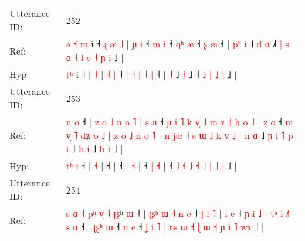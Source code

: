 \documentclass[10pt]{article}
\DeclareRobustCommand{\hl}[1]{{\textcolor{red}{#1}}}
\begin{document}
\begin{longtable}{ll}
 \\
\midrule
Utterance ID: & 252 \\
Ref: & \hl{ə}\hl{ }\hl{˧}\hl{ }\hl{m} i ˧\hl{ }\hl{ɻ} \hl{æ} \hl{˩} | \hl{ɲ} \hl{i} ˧\hl{ }\hl{m} \hl{i} ˧\hl{ }\hl{q}\hl{ʰ} \hl{æ} ˧\hl{ }\hl{ʂ} \hl{æ} ˧ |\hl{ }\hl{p}\hl{ʰ} \hl{i} ˩\hl{ }\hl{d} \hl{ɑ} ˩\hl{˥}\hl{ }\hl{|}\hl{ }\hl{s}\hl{ }\hl{ɑ} ˧\hl{ }\hl{l} \hl{e} \hl{˧} \hl{ɲ} \hl{i} ˩ |
 \\
Hyp: & \hl{}\hl{}\hl{}\hl{t}\hl{ʰ} i ˧\hl{}\hl{} \hl{|} \hl{˧} | \hl{˧} \hl{|} ˧\hl{}\hl{} \hl{|} ˧\hl{}\hl{}\hl{} \hl{|} ˧\hl{}\hl{} \hl{|} ˧ |\hl{}\hl{}\hl{} \hl{˧} ˩\hl{}\hl{} \hl{˧} ˩\hl{}\hl{}\hl{}\hl{}\hl{}\hl{}\hl{} ˧\hl{}\hl{} \hl{˩} \hl{|} \hl{˩} \hl{|} ˩ |
 \\
\midrule
Utterance ID: & 253 \\
Ref: & \hl{}\hl{n} \hl{o} ˧ |\hl{ }\hl{z}\hl{ }\hl{o}\hl{ }\hl{˩}\hl{ }\hl{n}\hl{ }\hl{o} \hl{˥} |\hl{ }\hl{s}\hl{ }\hl{ɑ} ˧\hl{ }\hl{ɲ}\hl{ }\hl{i}\hl{ }\hl{˥}\hl{ }\hl{k}\hl{ }\hl{v}\hl{̩}\hl{ }\hl{˩}\hl{ }\hl{m}\hl{ }\hl{ɤ}\hl{ }\hl{˩}\hl{ }\hl{h}\hl{ }\hl{o}\hl{ }\hl{˩} |\hl{ }\hl{z}\hl{ }\hl{o} ˧\hl{ }\hl{m}\hl{ }\hl{v}\hl{̩}\hl{ }\hl{˥}\hl{ }\hl{d}\hl{ʑ}\hl{ }\hl{o}\hl{ }\hl{˩} |\hl{ }\hl{z}\hl{ }\hl{o}\hl{ }\hl{˩}\hl{ }\hl{n}\hl{ }\hl{o} \hl{˥} |\hl{ }\hl{n}\hl{ }\hl{j}\hl{æ} ˧\hl{ }\hl{s}\hl{ }\hl{ɯ}\hl{ }\hl{˩}\hl{ }\hl{k} \hl{v}\hl{̩} \hl{˩} |\hl{ }\hl{n} \hl{ɑ} ˩\hl{ }\hl{ɲ}\hl{ }\hl{i} \hl{˥} \hl{p} \hl{i} ˩\hl{ }\hl{b} \hl{i} ˩\hl{ }\hl{b} \hl{i} ˩ |
 \\
Hyp: & \hl{t}\hl{ʰ} \hl{i} ˧ |\hl{}\hl{}\hl{}\hl{}\hl{}\hl{}\hl{}\hl{}\hl{}\hl{} \hl{˧} |\hl{}\hl{}\hl{}\hl{} ˧\hl{}\hl{}\hl{}\hl{}\hl{}\hl{}\hl{}\hl{}\hl{}\hl{}\hl{}\hl{}\hl{}\hl{}\hl{}\hl{}\hl{}\hl{}\hl{}\hl{}\hl{}\hl{}\hl{}\hl{}\hl{} |\hl{}\hl{}\hl{}\hl{} ˧\hl{}\hl{}\hl{}\hl{}\hl{}\hl{}\hl{}\hl{}\hl{}\hl{}\hl{}\hl{}\hl{}\hl{} |\hl{}\hl{}\hl{}\hl{}\hl{}\hl{}\hl{}\hl{}\hl{}\hl{} \hl{˧} |\hl{}\hl{}\hl{}\hl{}\hl{} ˧\hl{}\hl{}\hl{}\hl{}\hl{}\hl{}\hl{}\hl{} \hl{}\hl{|} \hl{˧} |\hl{}\hl{} \hl{˧} ˩\hl{}\hl{}\hl{}\hl{} \hl{˧} \hl{˩} \hl{˧} ˩\hl{}\hl{} \hl{|} ˩\hl{}\hl{} \hl{|} ˩ |
 \\
\midrule
Utterance ID: & 254 \\
Ref: & \hl{s}\hl{ }\hl{ɑ}\hl{ }\hl{˧}\hl{ }\hl{p}\hl{ʰ}\hl{ }\hl{v}\hl{̩}\hl{ }\hl{˧}\hl{ }\hl{ʈ}\hl{ʂ}ʰ \hl{ɯ} ˧ |\hl{ }\hl{ʈ}\hl{ʂ}\hl{ʰ}\hl{ }\hl{ɯ}\hl{ }\hl{˧}\hl{ }\hl{n}\hl{ }\hl{e} ˧\hl{ }\hl{ʝ}\hl{ }\hl{i}\hl{ }\hl{˥} |\hl{ }\hl{l}\hl{ }\hl{e} ˧\hl{ }\hl{ɲ}\hl{ }\hl{i}\hl{ }\hl{˩}\hl{ }\hl{|}\hl{ }\hl{t}\hl{ʰ}\hl{ }\hl{i}\hl{ }\hl{˩}\hl{˥} |\hl{ }\hl{s}\hl{ }\hl{ɑ} ˧ |\hl{ }\hl{ʈ}\hl{ʂ}\hl{ʰ}\hl{ }\hl{ɯ} ˧\hl{ }\hl{n} \hl{e} ˧\hl{ }\hl{ʝ}\hl{ }\hl{i}\hl{ }\hl{˥} |\hl{ }\hl{t}\hl{ɕ}\hl{ }\hl{ɯ}\hl{ }\hl{˧}\hl{ }\hl{ɭ}\hl{ }\hl{ɯ}\hl{ }\hl{˧}\hl{ }\hl{ɲ}\hl{ }\hl{i} \hl{˥} \hl{w}\hl{ɤ} ˩ |

\end{longtable}
\end{document}

